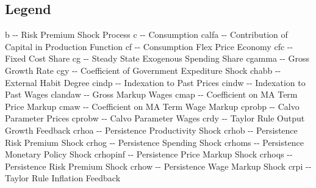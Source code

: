 \documentclass{article}%
\begin{document}
\subsection{Legend}%
\label{subsec:Legend}%
b           {-}{-}  Risk Premium Shock Process\newline%
c           {-}{-}  Consumption\newline%
calfa       {-}{-}  Contribution of Capital in Production Function\newline%
cf          {-}{-}  Consumption Flex Price Economy\newline%
cfc         {-}{-}  Fixed Cost Share\newline%
cg          {-}{-}  Steady State Exogenous Spending Share\newline%
cgamma      {-}{-}  Gross Growth Rate\newline%
cgy         {-}{-}  Coefficient of Government Expediture Shock\newline%
chabb       {-}{-}  External Habit Degree\newline%
cindp       {-}{-}  Indexation to Past Prices\newline%
cindw       {-}{-}  Indexation to Past Wages\newline%
clandaw     {-}{-}  Gross Markup Wages\newline%
cmap        {-}{-}  Coefficient on MA Term Price Markup\newline%
cmaw        {-}{-}  Coefficient on MA Term Wage Markup\newline%
cprobp      {-}{-}  Calvo Parameter Prices\newline%
cprobw      {-}{-}  Calvo Parameter Wages\newline%
crdy        {-}{-}  Taylor Rule Output Growth Feedback\newline%
crhoa       {-}{-}  Persistence Productivity Shock\newline%
crhob       {-}{-}  Persistence Risk Premium Shock\newline%
crhog       {-}{-}  Persistence Spending Shock\newline%
crhoms      {-}{-}  Persistence Monetary Policy Shock\newline%
crhopinf    {-}{-}  Persistence Price Markup Shock\newline%
crhoqs      {-}{-}  Persistence Risk Premium Shock\newline%
crhow       {-}{-}  Persistence Wage Markup Shock\newline%
crpi        {-}{-}  Taylor Rule Inflation Feedback\newline%
\end{document}
